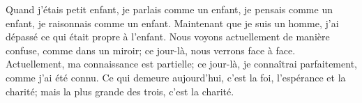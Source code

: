 Quand j’étais petit enfant, je parlais comme un enfant,
	je pensais comme un enfant, je raisonnais comme un enfant.
Maintenant que je suis un homme,
	j’ai dépassé ce qui était propre à l’enfant.
Nous voyons actuellement de manière confuse, comme dans un miroir;
	ce jour-là, nous verrons face à face.
Actuellement, ma connaissance est partielle;
	ce jour-là, je connaîtrai parfaitement, comme j’ai été connu.
Ce qui demeure aujourd’hui, c’est la foi, l’espérance et la charité;
	mais la plus grande des trois, c’est la charité.
